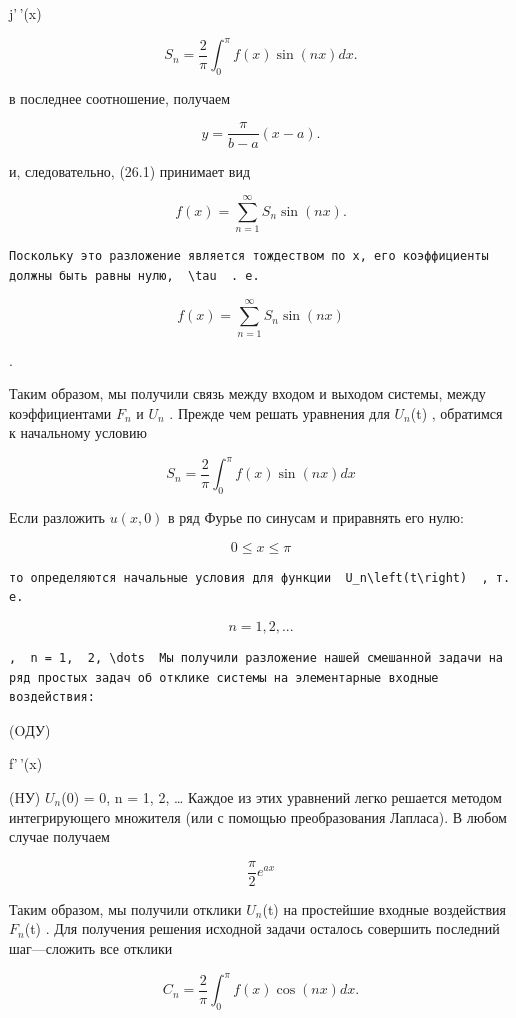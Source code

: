 \documentclass[
  ukrainian,
]{article}
\begin{document}
j'\,'(x)

\[
S_n = \frac{2}{\pi} \int_0^{\pi} f(x) \sin(nx) dx.
\]

в последнее соотношение, получаем

\[
y = \frac{\pi}{b - a} (x - a).
\]

и, следовательно, (26.1) принимает вид

\[
f(x) = \sum_{n=1}^{\infty} S_n \sin(nx).
\]

\begin{verbatim}
Поскольку это разложение является тождеством по x, его коэффициенты должны быть равны нулю,  \tau  . е.
\end{verbatim}

\[
f(x) = \sum_{n=1}^{\infty} S_n \sin(nx)
\]

.

Таким образом, мы получили связь между входом и выходом системы, между
коэффициентами \(F_n\) и \(U_n\) . Прежде чем решать уравнения для
\(U_n\)(t) , обратимся к начальному условию

\[
S_n = \frac{2}{\pi} \int_{0}^{\pi} f(x) \sin(nx) dx
\]

Если разложить \(u(x, 0)\) в ряд Фурье по синусам и приравнять его нулю:

\[
0 \le x \le \pi
\]

\begin{verbatim}
то определяются начальные условия для функции  U_n\left(t\right)  , т. е.
\end{verbatim}

\[
n = 1, 2, ...
\]

\begin{verbatim}
,  n = 1,  2, \dots  Мы получили разложение нашей смешанной задачи на ряд простых задач об отклике системы на элементарные входные воздействия:
\end{verbatim}

(OДУ)

f'\,'(x)

(HУ) \(U_n\)(0) = 0, n = 1, 2, \ldots{} Каждое из этих уравнений легко
решается методом интегрирующего множителя (или с помощью преобразования
Лапласа). В любом случае получаем

\[
\frac{\pi}{2} e^{ax}
\]

Таким образом, мы получили отклики \(U_n\)(t) на простейшие входные
воздействия \(F_n\)(t) . Для получения решения исходной задачи осталось
совершить последний шаг---сложить все отклики

\[
C_n = \frac{2}{\pi} \int_0^{\pi} f(x) \cos(nx) dx.
\]
\end{document}
